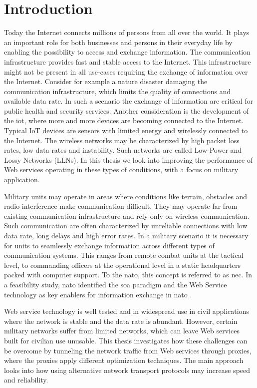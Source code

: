 
\chapter{Introduction}

Today the Internet connects millions of persons from all over the world. It
plays an important role for both businesses and persons in their everyday life
by enabling the possibility to access and exchange information. The
communication infrastructure provides fast and stable access to the Internet.
This infrastructure might not be present in all use-cases requiring the exchange
of information over the Internet. Consider for example a nature disaster
damaging the communication infrastructure, which limits the quality of
connections and available data rate. In such a scenario the exchange of
information are critical for public health and security services. Another
consideration is the development of the \gls{iot}, where more and more devices
are becoming connected to the Internet. Typical IoT devices are sensors with
limited energy and wirelessly connected to the Internet. The wireless networks
may be characterized by high packet loss rates, low data rates and instability.
Such networks are called Low-Power and Lossy Networks (LLNs). In this thesis we
look into improving the performance of Web services operating in these types of
conditions, with a focus on military application.


Military units may operate in areas where conditions like terrain, obstacles and
radio interference make communication difficult. They may operate far from
existing communication infrastructure and rely only on wireless communication.
Such communication are often characterized by unreliable connections with low
data rate, long delays and high error rates. In a military scenario it is
necessary for units to seamlessly exchange information across different types of
communication systems. This ranges from remote combat units at the tactical
level, to commanding officers at the operational level in a static headquarters
packed with computer support. To the \gls{nato}, this concept is referred to as
\gls{nec}. In a feasibility study, \gls{nato} identified the \gls{soa} paradigm
and the Web Service technology as key enablers for information exchange in
\gls{nato} \cite{nnec-study}.

Web service technology is well tested and in widespread use in civil
applications where the network is stable and the data rate is abundant. However,
certain military networks suffer from limited networks, which can leave Web
services built for civilian use unusable. This thesis investigates how these
challenges can be overcome by tunneling the network traffic from Web services
through proxies, where the proxies apply different optimization techniques. The
main approach looks into how using alternative network transport protocols may
increase speed and reliability.

